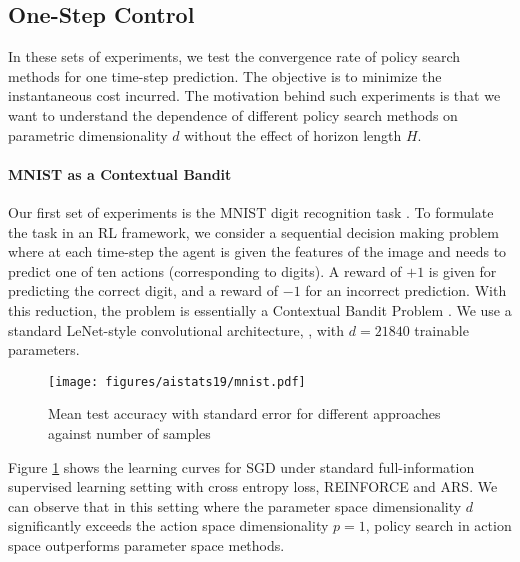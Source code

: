 \subsection{One-Step Control}
\label{sec:one-step-control}

In these sets of experiments, we test the convergence rate of policy
search methods for one time-step prediction. The objective is to minimize the instantaneous cost incurred. The motivation behind such experiments is that we want to
understand the dependence of different policy search methods on
parametric dimensionality $d$ without the effect of horizon length
$H$.

%
%


\paragraph{MNIST as a Contextual Bandit} Our first set of experiments is the MNIST digit recognition task 
\citep{lecun1998gradient}. To formulate the task in an RL framework, we
consider a sequential decision making problem where at each time-step
the agent is given the features of the image and needs to predict one
of ten actions (corresponding to digits). A reward of $+1$
is given for predicting the correct digit, and a reward of $-1$ for
an incorrect prediction. With this reduction, the problem is essentially a Contextual Bandit Problem \citep{agarwal2014taming}. We use a standard LeNet-style convolutional architecture,
\citep{lecun1998gradient}, with $d=21840$ trainable parameters.
\begin{figure}[t]
  \centering
  \texttt{[image: figures/aistats19/mnist.pdf]}
  \caption{Mean test accuracy with standard error for different
    approaches against number of samples}
  \label{fig:mnist}
\end{figure}
Figure \ref{fig:mnist} shows the learning curves for SGD under standard full-information
supervised learning setting with cross entropy loss, REINFORCE and ARS. 
%
%
%
We can
observe that in this setting where the parameter space dimensionality
$d$ significantly exceeds the action space dimensionality $p = 1$, policy search in
action space outperforms parameter space methods.

%
%


